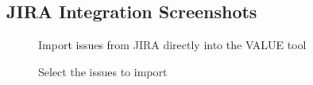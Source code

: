 \documentclass{article}
\begin{document}
\begin{appendices}
\section{JIRA Integration Screenshots}

\begin{figure}[H]
    \centering
    \captionsetup{labelformat=empty}
    \caption{Import issues from JIRA directly into the VALUE tool}
    \noindent{}
\end{figure}

\begin{figure}[H]
    \centering
    \captionsetup{labelformat=empty}
    \caption{Select the issues to import}
    \noindent{}
\end{figure}


\end{appendices}
\end{document}
